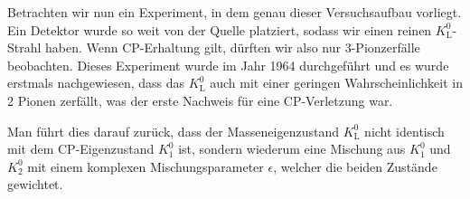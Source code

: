 Betrachten wir nun ein Experiment, in dem genau dieser Versuchsaufbau vorliegt.
Ein Detektor wurde so weit von der Quelle platziert, sodass wir einen reinen $K^0_\text{L}$-Strahl haben.
Wenn CP-Erhaltung gilt, dürften wir also nur 3-Pionzerfälle beobachten.
Dieses Experiment wurde im Jahr 1964 durchgeführt und es wurde erstmals nachgewiesen, dass das $K^0_\text{L}$ auch mit einer geringen Wahrscheinlichkeit in 2 Pionen zerfällt, was der erste Nachweis für eine CP-Verletzung war.

Man führt dies darauf zurück, dass der Masseneigenzustand $K^0_\text{L}$ nicht identisch mit dem CP-Eigenzustand $K^0_1$ ist, sondern wiederum eine Mischung aus $K^0_1$ und $K^0_2$ mit einem komplexen Mischungsparameter $\epsilon$, welcher die beiden Zustände gewichtet.
